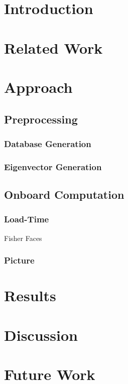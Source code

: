 \section{Introduction} %
\section{Related Work} %
\section{Approach} %
\subsection{Preprocessing}
\subsubsection{Database Generation}
\subsubsection{Eigenvector Generation}
\subsection{Onboard Computation}
\subsubsection{Load-Time}
Fisher Faces
\subsubsection{Picture}
\section{Results} %
\section{Discussion} %
\section{Future Work} %
